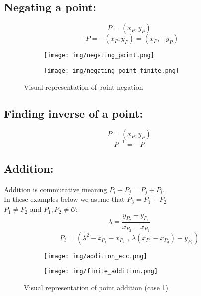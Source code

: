 \documentclass[bp,en]{FEIstyle}
\begin{document}
\subsection*{Negating a point:}
\[ 
P = (x_P, y_P) 
\]
\[ 
-P = -(x_P, y_P) = (x_P, - y_P)
\]
\begin{figure}[H]
    \centering
    \begin{subfigure}{0.4\textwidth}
        \texttt{[image: img/negating\_point.png]}
        \label{fig:negating_point_curve_1}
    \end{subfigure}%
    \begin{subfigure}{0.4255\textwidth}
        \texttt{[image: img/negating\_point\_finite.png]}
        \label{fig:negating_point_curve_2}
    \end{subfigure}%
    \caption{Visual representation of point negation }
    \label{fig:negating_point_curves}
\end{figure}
\subsection*{Finding inverse of a point:}
\[ 
P = (x_P, y_P) 
\]
\[ 
P^{-1} = -P 
\]
\subsection*{Addition:}
Addition is commutative meaning $P_i + P_j = P_j + P_i$. \\
In these examples below we asume that $P_3 = P_1 + P_2$\\
 $P_1 \neq P_2$ and $P_1,P_2 \neq \mathcal{O} $:
\[
\lambda = \frac{y_{P_2} - y_{P_1}}{x_{P_2} - x_{P_1}}
\]
\[
P_3 = (\lambda^2 - x_{P_1} - x_{P_2}\text{ , } \lambda(x_{P_1} - x_{P_3}) - y_{P_1})
\]
\begin{figure}[H]
    \centering
    \begin{subfigure}{0.38\textwidth}
        \texttt{[image: img/addition\_ecc.png]}
        \label{fig:addition_curve_1}
    \end{subfigure}%
    \begin{subfigure}{0.412\textwidth}
    
        \texttt{[image: img/finite\_addition.png]}
        \label{fig:addition_curve_2}
    \end{subfigure}%
    \caption{Visual representation of point addition (case 1)}
    \label{fig:addition_elliptic_curves_1}
\end{figure}
\end{document}
